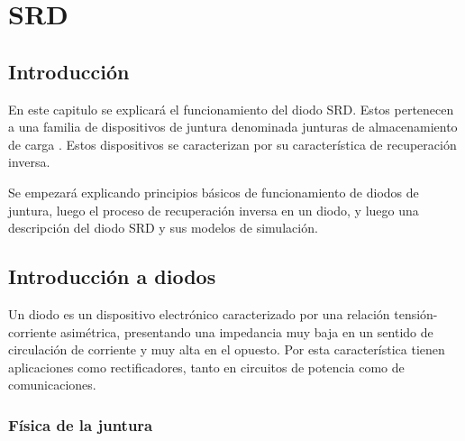 \chapter{SRD}

\section{Introducción}

En este capitulo se explicará el funcionamiento del diodo SRD.  Estos pertenecen
a una familia de dispositivos de juntura denominada junturas de almacenamiento
de carga \cite{moll1962}. Estos dispositivos se caracterizan por su
característica de recuperación inversa.

Se empezará explicando principios básicos de funcionamiento de diodos de
juntura, luego el proceso de recuperación inversa en un diodo, y luego una
descripción del diodo SRD y sus modelos de simulación.

\section{Introducción a diodos}

Un diodo es un dispositivo electrónico caracterizado por una relación
tensión-corriente asimétrica, presentando una impedancia muy baja en un sentido
de circulación de corriente y muy alta en el opuesto. Por esta característica
tienen aplicaciones como rectificadores, tanto en circuitos de potencia como de
comunicaciones.

\subsection{Física de la juntura}
\label{sec:junction_physics}


